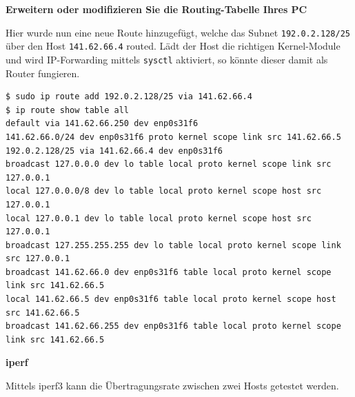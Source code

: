 \textbf{Erweitern oder modifizieren Sie die Routing-Tabelle Ihres PC}

Hier wurde nun eine neue Route hinzugefügt, welche das Subnet
\texttt{192.0.2.128/25} über den Host \texttt{141.62.66.4} routed. Lädt
der Host die richtigen Kernel-Module und wird IP-Forwarding mittels
\texttt{sysctl} aktiviert, so könnte dieser damit als Router fungieren.

\begin{verbatim}
$ sudo ip route add 192.0.2.128/25 via 141.62.66.4
$ ip route show table all
default via 141.62.66.250 dev enp0s31f6
141.62.66.0/24 dev enp0s31f6 proto kernel scope link src 141.62.66.5
192.0.2.128/25 via 141.62.66.4 dev enp0s31f6
broadcast 127.0.0.0 dev lo table local proto kernel scope link src 127.0.0.1
local 127.0.0.0/8 dev lo table local proto kernel scope host src 127.0.0.1
local 127.0.0.1 dev lo table local proto kernel scope host src 127.0.0.1
broadcast 127.255.255.255 dev lo table local proto kernel scope link src 127.0.0.1
broadcast 141.62.66.0 dev enp0s31f6 table local proto kernel scope link src 141.62.66.5
local 141.62.66.5 dev enp0s31f6 table local proto kernel scope host src 141.62.66.5
broadcast 141.62.66.255 dev enp0s31f6 table local proto kernel scope link src 141.62.66.5
\end{verbatim}

\textbf{iperf}

Mittels iperf3 kann die Übertragungsrate zwischen zwei Hosts getestet
werden.

